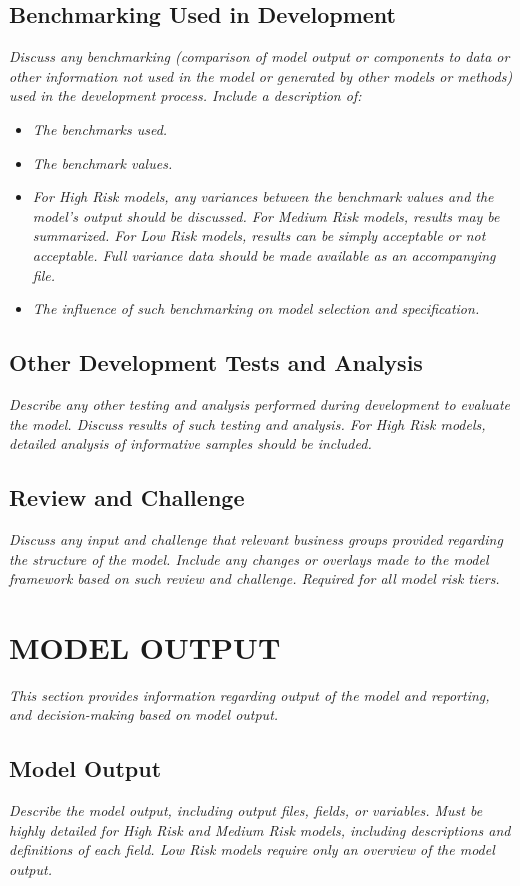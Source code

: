 \documentclass[12pt,letterpaper]{article}
\begin{document}
\subsection{Benchmarking Used in Development}
\textit{Discuss any benchmarking (comparison of model output or components to data or other information not used in the model or generated by other models or methods) used in the development process. Include a description of:}
\begin{itemize}
\item \textit{The benchmarks used.}
\item \textit{The benchmark values.}
\item \textit{For High Risk models, any variances between the benchmark values and the model's output should be discussed. For Medium Risk models, results may be summarized. For Low Risk models, results can be simply acceptable or not acceptable. Full variance data should be made available as an accompanying file.}
\item \textit{The influence of such benchmarking on model selection and specification.}
\end{itemize}

\subsection{Other Development Tests and Analysis}
\textit{Describe any other testing and analysis performed during development to evaluate the model. Discuss results of such testing and analysis. For High Risk models, detailed analysis of informative samples should be included.}

\subsection{Review and Challenge}
\textit{Discuss any input and challenge that relevant business groups provided regarding the structure of the model. Include any changes or overlays made to the model framework based on such review and challenge. Required for all model risk tiers.}

\section{MODEL OUTPUT}
\textit{This section provides information regarding output of the model and reporting, and decision-making based on model output.}

\subsection{Model Output}
\textit{Describe the model output, including output files, fields, or variables. Must be highly detailed for High Risk and Medium Risk models, including descriptions and definitions of each field. Low Risk models require only an overview of the model output.}
\end{document}
